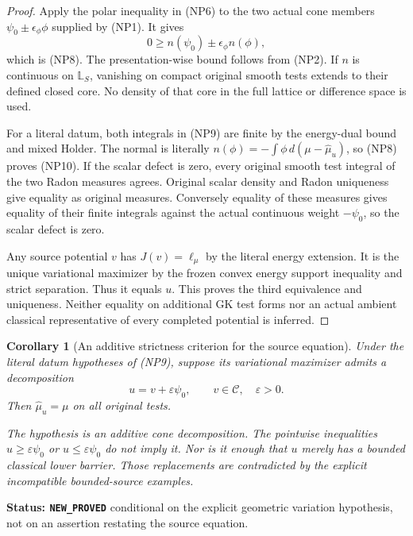 \documentclass[11pt,a4paper]{article}
\numberwithin{equation}{section}
\newtheorem{corollary}[theorem]{Corollary}
\theoremstyle{definition}
\theoremstyle{remark}
\begin{document}
\begin{proof}
Apply the polar inequality in \textup{(NP6)} to the
two actual cone members
$\psi_0\pm\epsilon_\phi\phi$ supplied by \textup{(NP1)}.
It gives
\[
               0\ge n(\psi_0)\pm\epsilon_\phi n(\phi),
\]
which is \textup{(NP8)}.  The presentation-wise bound
follows from \textup{(NP2)}.  If $n$ is continuous on
$\mathbb L_S$, vanishing on compact original smooth
tests extends to their defined closed core.  No density
of that core in the full lattice or difference space
is used.

For a literal datum, both integrals in \textup{(NP9)}
are finite by the energy-dual bound and mixed Holder.
The normal is literally
$n(\phi)=-\int\phi\,d(\mu-\widehat\mu_u)$,
so \textup{(NP8)} proves \textup{(NP10)}.
If the scalar defect is zero, every original smooth
test integral of the two Radon measures agrees.
Original scalar density and Radon uniqueness give
equality as original measures.  Conversely equality
of these measures gives equality of their finite
integrals against the actual continuous weight
$-\psi_0$, so the scalar defect is zero.

Any source potential $v$ has $J(v)=\ell_\mu$ by
the literal energy extension.  It is the unique
variational maximizer by the frozen convex energy
support inequality and strict separation.  Thus it
equals $u$.  This proves the third equivalence and
uniqueness.  Neither equality on additional GK test
forms nor an actual ambient classical representative
of every completed potential is inferred.
\end{proof}

\begin{corollary}[An additive strictness criterion for the source equation]
\label{cor:r12-additive-probe-source-criterion}
Under the literal datum hypotheses of \textup{(NP9)},
suppose its variational maximizer admits a decomposition
\[
                  u=v+\varepsilon\psi_0,
                  \qquad v\in\mathscr C,\quad\varepsilon>0.
 \tag{NP11}
\]
Then $\widehat\mu_u=\mu$ on all original tests.

The hypothesis is an \emph{additive cone decomposition}.
The pointwise inequalities $u\ge\varepsilon\psi_0$ or
$u\le\varepsilon\psi_0$ do not imply it.  Nor is it
enough that $u$ merely has a bounded classical lower
barrier.  Those replacements are contradicted by the
explicit incompatible bounded-source examples.
\end{corollary}

\noindent\textbf{Status: \texttt{NEW\_PROVED}} conditional
on the explicit geometric variation hypothesis, not on
an assertion restating the source equation.
\end{document}
